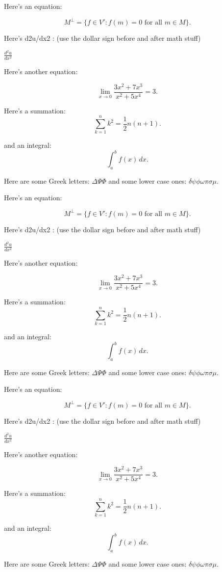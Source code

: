 Here's an equation:

\[ M^\bot = \{ f \in V' : f(m) = 0 \mbox{ for all } m \in M \}.\]

Here's d2u/dx2 : (use the dollar sign before and after math stuff)

$ \frac{d^2 u}{dx^2} $


Here's another equation:

\[ \lim_{x \to 0} \frac{3x^2 +7x^3}{x^2 +5x^4} = 3.\]

Here's a summation:
\[ \sum_{k=1}^n k^2 = \frac{1}{2} n (n+1).\] 

and an integral:
\[ \int_a^b f(x)\,dx.\]

Here are some Greek letters:
$ \Delta \Psi \Phi $
and some lower case ones:
$ \delta \psi \phi \omega \pi \sigma \mu $.

Here's an equation:

\[ M^\bot = \{ f \in V' : f(m) = 0 \mbox{ for all } m \in M \}.\]

Here's d2u/dx2 : (use the dollar sign before and after math stuff)

$ \frac{d^2 u}{dx^2} $


Here's another equation:

\[ \lim_{x \to 0} \frac{3x^2 +7x^3}{x^2 +5x^4} = 3.\]

Here's a summation:
\[ \sum_{k=1}^n k^2 = \frac{1}{2} n (n+1).\] 

and an integral:
\[ \int_a^b f(x)\,dx.\]

Here are some Greek letters:
$ \Delta \Psi \Phi $
and some lower case ones:
$ \delta \psi \phi \omega \pi \sigma \mu $.

Here's an equation:

\[ M^\bot = \{ f \in V' : f(m) = 0 \mbox{ for all } m \in M \}.\]

Here's d2u/dx2 : (use the dollar sign before and after math stuff)

$ \frac{d^2 u}{dx^2} $


Here's another equation:

\[ \lim_{x \to 0} \frac{3x^2 +7x^3}{x^2 +5x^4} = 3.\]

Here's a summation:
\[ \sum_{k=1}^n k^2 = \frac{1}{2} n (n+1).\] 

and an integral:
\[ \int_a^b f(x)\,dx.\]

Here are some Greek letters:
$ \Delta \Psi \Phi $
and some lower case ones:
$ \delta \psi \phi \omega \pi \sigma \mu $.
